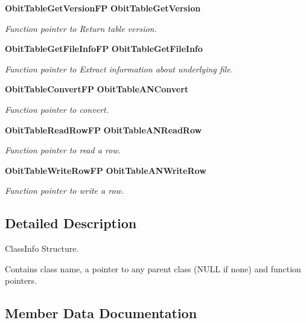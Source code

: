 \begin{CompactItemize}
{\bf Obit\-Table\-Get\-Version\-FP} {\bf Obit\-Table\-Get\-Version}
\begin{CompactList}\small\item\em Function pointer to Return table version. \item\end{CompactList}\item 
{\bf Obit\-Table\-Get\-File\-Info\-FP} {\bf Obit\-Table\-Get\-File\-Info}
\begin{CompactList}\small\item\em Function pointer to Extract information about underlying file. \item\end{CompactList}\item 
{\bf Obit\-Table\-Convert\-FP} {\bf Obit\-Table\-ANConvert}
\begin{CompactList}\small\item\em Function pointer to convert. \item\end{CompactList}\item 
{\bf Obit\-Table\-Read\-Row\-FP} {\bf Obit\-Table\-ANRead\-Row}
\begin{CompactList}\small\item\em Function pointer to read a row. \item\end{CompactList}\item 
{\bf Obit\-Table\-Write\-Row\-FP} {\bf Obit\-Table\-ANWrite\-Row}
\begin{CompactList}\small\item\em Function pointer to write a row. \item\end{CompactList}\end{CompactItemize}


\subsection{Detailed Description}
Class\-Info Structure. 

Contains class name, a pointer to any parent class (NULL if none) and function pointers. 



\subsection{Member Data Documentation}
